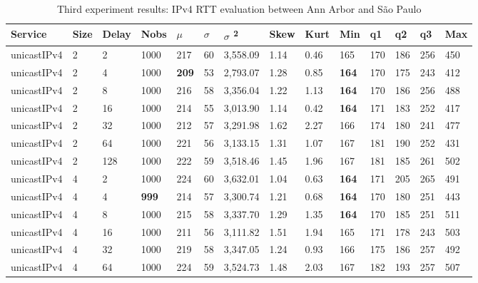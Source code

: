 \begin{table}[!htb]
	\small
	\centering
	\caption{Third experiment results: IPv4 RTT evaluation between Ann Arbor and São Paulo}
	\label{tab:thirdtrialarbsaoipv4}
	\begin{tabular}{@{}llllllllllllll@{}}
		\toprule
		Service    & Size & Delay & Nobs & $\mu$ & $\sigma$  & $\sigma$ \textsuperscript{2} & Skew & Kurt & Min & q1   & q2   & q3   & Max   \\ \midrule
		unicastIPv4 & 2            & 2     & 1000 & 217  & 60  & 3,558.09 & 1.14     & 0.46     & 165 & 170 & 186 & 256 & 450  \\
		unicastIPv4 & 2            & 4     & 1000 & \textbf{209}  & 53  & 2,793.07 & 1.28     & 0.85     & \textbf{164} & 170 & 175 & 243 & 412  \\
		unicastIPv4 & 2            & 8     & 1000 & 216  & 58  & 3,356.04 & 1.22     & 1.13     & \textbf{164} & 170 & 186 & 256 & 488  \\
		unicastIPv4 & 2            & 16    & 1000 & 214  & 55  & 3,013.90 & 1.14     & 0.42     & \textbf{164} & 171 & 183 & 252 & 417  \\
		unicastIPv4 & 2            & 32    & 1000 & 212  & 57  & 3,291.98 & 1.62     & 2.27     & 166 & 174 & 180 & 241 & 477  \\
		unicastIPv4 & 2            & 64    & 1000 & 221  & 56  & 3,133.15 & 1.31     & 1.07     & 167 & 181 & 190 & 252 & 431  \\
		unicastIPv4 & 2            & 128   & 1000 & 222  & 59  & 3,518.46 & 1.45     & 1.96     & 167 & 181 & 185 & 261 & 502  \\ \hline
		unicastIPv4 & 4            & 2     & 1000 & 224  & 60  & 3,632.01 & 1.04     & 0.63     & \textbf{164} & 171 & 205 & 265 & 491  \\
		unicastIPv4 & 4            & 4     & \textbf{999}  & 214  & 57  & 3,300.74 & 1.21     & 0.68     & \textbf{164} & 170 & 180 & 251 & 443  \\
		unicastIPv4 & 4            & 8     & 1000 & 215  & 58  & 3,337.70 & 1.29     & 1.35     & \textbf{164} & 170 & 185 & 251 & 511  \\
		unicastIPv4 & 4            & 16    & 1000 & 211  & 56  & 3,111.82 & 1.51     & 1.94     & 165 & 171 & 178 & 243 & 503  \\
		unicastIPv4 & 4            & 32    & 1000 & 219  & 58  & 3,347.05 & 1.24     & 0.93     & 166 & 175 & 186 & 257 & 492  \\
		unicastIPv4 & 4            & 64    & 1000 & 224  & 59  & 3,524.73 & 1.48     & 2.03     & 167 & 182 & 193 & 257 & 507  \\

\end{tabular}
\end{table}
